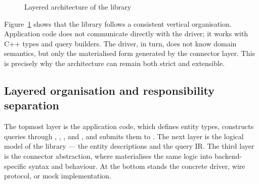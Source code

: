 \begin{figure}[H]
\centering
{}
\caption{Layered architecture of the library}
\label{fig:architecture_layers}
\end{figure}

Figure~\ref{fig:architecture_layers} shows that the library follows a consistent vertical organisation. Application code does not communicate directly with the driver; it works with C++ types and query builders. The driver, in turn, does not know domain semantics, but only the materialised form generated by the connector layer. This is precisely why the architecture can remain both strict and extensible.

\subsection{Layered organisation and responsibility separation}

The topmost layer is the application code, which defines entity types, constructs queries through , , , and , and submits them to . The next layer is the logical model of the library --- the entity descriptions and the query IR. The third layer is the connector abstraction, where  materialises the same logic into backend-specific syntax and behaviour. At the bottom stands the concrete driver, wire protocol, or mock implementation.

